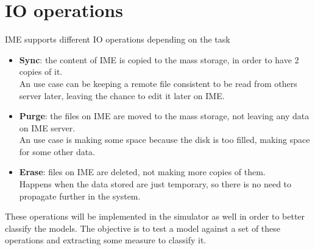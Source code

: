 \section{IO operations}
IME supports different IO operations depending on the task
\begin{itemize}
    \item \textbf{Sync}: the content of IME is copied to the mass storage, in
        order to have 2 copies of it. \\
        An use case can be keeping a remote file consistent to be read from
        others server later, leaving the chance to edit it later on IME.
    \item \textbf{Purge}: the files on IME are moved to the mass storage, not
        leaving any data on IME server. \\
        An use case is making some space because the disk is too filled, making
        space for some other data.
    \item \textbf{Erase}: files on IME are deleted, not making more copies of
        them. \\
        Happens when the data stored are just temporary, so there is no need to
        propagate further in the system.
\end{itemize}

These operations will be implemented in the simulator as well in order to better
classify the models. The objective is to test a model against a set of these
operations and extracting some measure to classify it.
